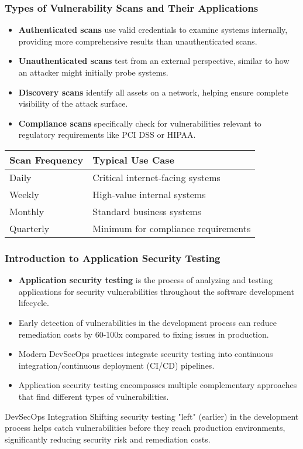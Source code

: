 \documentclass{beamer}
\begin{document}
\begin{frame}
\frametitle{Types of Vulnerability Scans and Their Applications}
\begin{itemize}
\item \textbf{Authenticated scans} use valid credentials to examine systems internally, providing more comprehensive results than unauthenticated scans.
\item \textbf{Unauthenticated scans} test from an external perspective, similar to how an attacker might initially probe systems.
\item \textbf{Discovery scans} identify all assets on a network, helping ensure complete visibility of the attack surface.
\item \textbf{Compliance scans} specifically check for vulnerabilities relevant to regulatory requirements like PCI DSS or HIPAA.
\end{itemize}

\begin{table}
\scriptsize
\begin{tabular}{lp{7cm}}
\toprule
\textbf{Scan Frequency} & \textbf{Typical Use Case} \\
\midrule
Daily & Critical internet-facing systems \\
Weekly & High-value internal systems \\
Monthly & Standard business systems \\
Quarterly & Minimum for compliance requirements \\
\bottomrule
\end{tabular}
\end{table}
\end{frame}

\begin{frame}
\frametitle{Introduction to Application Security Testing}
\begin{itemize}
\item \textbf{Application security testing} is the process of analyzing and testing applications for security vulnerabilities throughout the software development lifecycle.
\item Early detection of vulnerabilities in the development process can reduce remediation costs by 60-100x compared to fixing issues in production.
\item Modern DevSecOps practices integrate security testing into continuous integration/continuous deployment (CI/CD) pipelines.
\item Application security testing encompasses multiple complementary approaches that find different types of vulnerabilities.
\end{itemize}

\begin{alertblock}{DevSecOps Integration}
\scriptsize
Shifting security testing "left" (earlier) in the development process helps catch vulnerabilities before they reach production environments, significantly reducing security risk and remediation costs.
\end{alertblock}
\end{frame}
\end{document}
